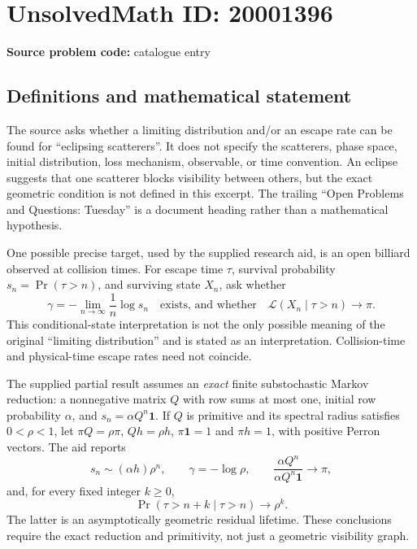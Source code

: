 \documentclass[11pt]{article}
\begin{document}
\section*{UnsolvedMath ID: 20001396}
\textbf{Source problem code:} catalogue entry
\subsection{Definitions and mathematical statement}
The source asks whether a limiting distribution and/or an escape rate can be found for ``eclipsing scatterers''. It does not specify the scatterers, phase space, initial distribution, loss mechanism, observable, or time convention. An eclipse suggests that one scatterer blocks visibility between others, but the exact geometric condition is not defined in this excerpt. The trailing ``Open Problems and Questions: Tuesday'' is a document heading rather than a mathematical hypothesis.

One possible precise target, used by the supplied research aid, is an open billiard observed at collision times. For escape time $\tau$, survival probability $s_n=\Pr(\tau>n)$, and surviving state $X_n$, ask whether
\[
 \gamma=-\lim_{n\to\infty}\frac1n\log s_n
 \quad\text{exists, and whether}\quad
 \mathcal L(X_n\mid\tau>n)\longrightarrow\pi.
\]
This conditional-state interpretation is not the only possible meaning of the original ``limiting distribution'' and is stated as an interpretation. Collision-time and physical-time escape rates need not coincide.

The supplied partial result assumes an \emph{exact} finite substochastic Markov reduction: a nonnegative matrix $Q$ with row sums at most one, initial row probability $\alpha$, and $s_n=\alpha Q^n\mathbf1$. If $Q$ is primitive and its spectral radius satisfies $0<\rho<1$, let $\pi Q=\rho\pi$, $Qh=\rho h$, $\pi\mathbf1=1$ and $\pi h=1$, with positive Perron vectors. The aid reports
\[
 s_n\sim(\alpha h)\rho^n,\qquad \gamma=-\log\rho,
 \qquad\frac{\alpha Q^n}{\alpha Q^n\mathbf1}\longrightarrow\pi,
\]
and, for every fixed integer $k\geq0$,
\[
 \Pr(\tau>n+k\mid\tau>n)\longrightarrow\rho^k.
\]
The latter is an asymptotically geometric residual lifetime. These conclusions require the exact reduction and primitivity, not just a geometric visibility graph.
\end{document}
